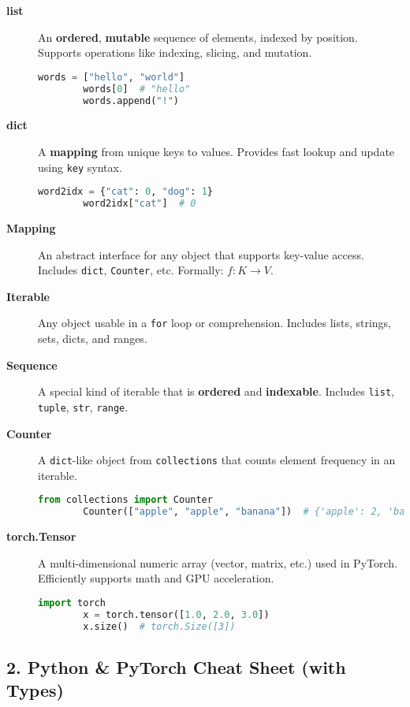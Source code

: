 \begin{description}
	\item[\textbf{list}] An \textbf{ordered}, \textbf{mutable} sequence of elements, indexed by position. Supports operations like indexing, slicing, and mutation.
	\begin{lstlisting}[language=Python]
		words = ["hello", "world"]
		words[0]  # "hello"
		words.append("!")
	\end{lstlisting}
	
	\item[\textbf{dict}] A \textbf{mapping} from unique keys to values. Provides fast lookup and update using \texttt{key} syntax.
	\begin{lstlisting}[language=Python]
		word2idx = {"cat": 0, "dog": 1}
		word2idx["cat"]  # 0
	\end{lstlisting}
	
	\item[\textbf{Mapping}] An abstract interface for any object that supports key-value access. Includes \texttt{dict}, \texttt{Counter}, etc. Formally: $f : K \rightarrow V$.
	
	\item[\textbf{Iterable}] Any object usable in a \texttt{for} loop or comprehension. Includes lists, strings, sets, dicts, and ranges.
	
	\item[\textbf{Sequence}] A special kind of iterable that is \textbf{ordered} and \textbf{indexable}. Includes \texttt{list}, \texttt{tuple}, \texttt{str}, \texttt{range}.
	
	\item[\textbf{Counter}] A \texttt{dict}-like object from \texttt{collections} that counts element frequency in an iterable.
	\begin{lstlisting}[language=Python]
		from collections import Counter
		Counter(["apple", "apple", "banana"])  # {'apple': 2, 'banana': 1}
	\end{lstlisting}
	
	\item[\textbf{torch.Tensor}] A multi-dimensional numeric array (vector, matrix, etc.) used in PyTorch. Efficiently supports math and GPU acceleration.
	\begin{lstlisting}[language=Python]
		import torch
		x = torch.tensor([1.0, 2.0, 3.0])
		x.size()  # torch.Size([3])
	\end{lstlisting}
\end{description}

\subsection*{2. Python \& PyTorch Cheat Sheet (with Types)}

